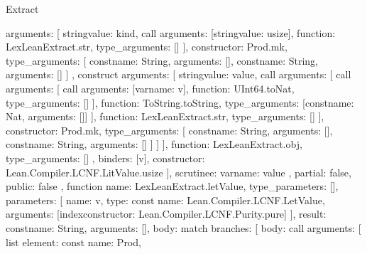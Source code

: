 \begin{lexlean}{Extract}
\begin{toolingmodule}
{{{{{{{                      arguments: [
                        string{value: kind},
                        call{
                          arguments: [string{value: usize}],
                          function: LexLeanExtract.str,
                          type_arguments: []
                        }
                      ],
                      constructor: Prod.mk,
                      type_arguments: [
                        const{name: String, arguments: []},
                        const{name: String, arguments: []}
                      ]
                    },
                    construct{
                      arguments: [
                        string{value: value},
                        call{
                          arguments: [
                            call{
                              arguments: [
                                call{
                                  arguments: [var{name: v}],
                                  function: UInt64.toNat,
                                  type_arguments: []
                                }
                              ],
                              function: ToString.toString,
                              type_arguments: [const{name: Nat, arguments: []}]
                            }
                          ],
                          function: LexLeanExtract.str,
                          type_arguments: []
                        }
                      ],
                      constructor: Prod.mk,
                      type_arguments: [
                        const{name: String, arguments: []},
                        const{name: String, arguments: []}
                      ]
                    }
                  ]
                }
              ],
              function: LexLeanExtract.obj,
              type_arguments: []
            },
            binders: [v],
            constructor: Lean.Compiler.LCNF.LitValue.usize
          }
        ],
        scrutinee: var{name: value}
      },
      partial: false,
      public: false
    },
    function{
      name: LexLeanExtract.letValue,
      type_parameters: [],
      parameters: [
        {
          name: v,
          type: const{
            name: Lean.Compiler.LCNF.LetValue,
            arguments: [index{constructor: Lean.Compiler.LCNF.Purity.pure}]
          }
        }
      ],
      result: const{name: String, arguments: []},
      body: match{
        branches: [
          {
            body: call{
              arguments: [
                list{
                  element: const{
                    name: Prod,
}}}}}}}
\end{toolingmodule}
\end{lexlean}

